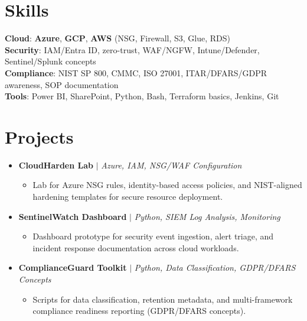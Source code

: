 \documentclass[letterpaper,10pt]{article}
\newcommand{\resumeItem}[1]{\item\small{{#1 \vspace{-2pt}}}}
\newcommand{\resumeProjectHeading}[1]{\item \small #1 \vspace{-2pt}}
\newcommand{\resumeSubHeadingListStart}{\begin{itemize}[leftmargin=0.0in, label={}]}
\newcommand{\resumeSubHeadingListEnd}{\end{itemize}}
\newcommand{\resumeProjItemListStart}{\begin{itemize}[leftmargin=0.15in,label=\textbullet,itemsep=0pt,topsep=0pt,parsep=0pt,partopsep=0pt]}
\newcommand{\resumeProjItemListEnd}{\end{itemize}\vspace{-4pt}}
\begin{document}
\section{Skills}
\begin{itemize}[leftmargin=0.15in, label={}]
\small{\item{
\textbf{Cloud}: \textbf{Azure}, \textbf{GCP}, \textbf{AWS} (NSG, Firewall, S3, Glue, RDS) \\
\textbf{Security}: IAM/Entra ID, zero-trust, WAF/NGFW, Intune/Defender, Sentinel/Splunk concepts \\
\textbf{Compliance}: NIST SP 800, CMMC, ISO 27001, ITAR/DFARS/GDPR awareness, SOP documentation \\
\textbf{Tools}: Power BI, SharePoint, Python, Bash, Terraform basics, Jenkins, Git
}}
\end{itemize}
\vspace{-16pt}
\section{Projects}
\resumeSubHeadingListStart
\vspace{-2pt}
\resumeProjectHeading{\textbf{CloudHarden Lab} $|$ \emph{Azure, IAM, NSG/WAF Configuration}}
\resumeProjItemListStart
\resumeItem{Lab for Azure NSG rules, identity-based access policies, and NIST-aligned hardening templates for secure resource deployment.}
\resumeProjItemListEnd
\vspace{3pt}
\resumeProjectHeading{\textbf{SentinelWatch Dashboard} $|$ \emph{Python, SIEM Log Analysis, Monitoring}}
\resumeProjItemListStart
\resumeItem{Dashboard prototype for security event ingestion, alert triage, and incident response documentation across cloud workloads.}
\resumeProjItemListEnd
\vspace{3pt}
\resumeProjectHeading{\textbf{ComplianceGuard Toolkit} $|$ \emph{Python, Data Classification, GDPR/DFARS Concepts}}
\resumeProjItemListStart
\resumeItem{Scripts for data classification, retention metadata, and multi-framework compliance readiness reporting (GDPR/DFARS concepts).}
\resumeProjItemListEnd
\resumeSubHeadingListEnd
\end{document}
